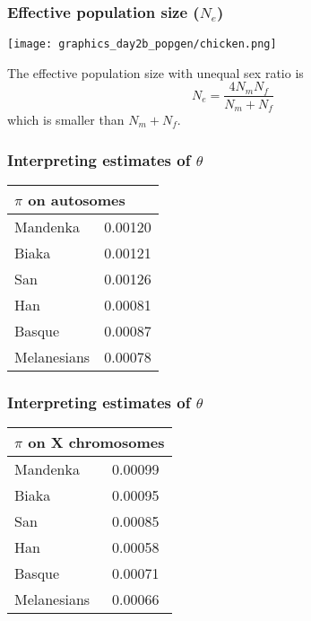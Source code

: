\documentclass{beamer}
\newcommand{\1}{\ensuremath{\mathbf{1}}}
\begin{document}
%
%
%
\begin{frame}\frametitle{Effective population size ($N_e$)}
	\begin{center}
		\texttt{[image: graphics\_day2b\_popgen/chicken.png]}
	\end{center}
	The effective population size with unequal sex ratio is
	\begin{equation}
		N_e = \frac{4N_m N_f}{N_m + N_f}
	\end{equation}
	which is smaller than $N_m + N_f$.
\end{frame}
%
%
%
\begin{frame}\frametitle{Interpreting estimates of $\theta$}
	\begin{center}
		\begin{tabular}{ll}
			\toprule
			\multicolumn{2}{l}{$\pi$ on autosomes}	\\
			\midrule
			Mandenka	& 0.00120	\\
			Biaka		& 0.00121	\\
			San			& 0.00126	\\
			Han			& 0.00081	\\
			Basque		& 0.00087	\\
			Melanesians	& 0.00078	\\
			\bottomrule
	   	\end{tabular}	
	\end{center}
\end{frame}
%
%
%
\begin{frame}\frametitle{Interpreting estimates of $\theta$}
	\begin{center}
		\begin{tabular}{ll}
			\toprule
			\multicolumn{2}{l}{$\pi$ on X chromosomes}	\\
			\midrule
			Mandenka	& 0.00099	\\
			Biaka		& 0.00095	\\
			San			& 0.00085	\\
			Han			& 0.00058	\\
			Basque		& 0.00071	\\
			Melanesians	& 0.00066	\\
			\bottomrule
	   	\end{tabular}	
	\end{center}
\end{frame}
\end{document}
